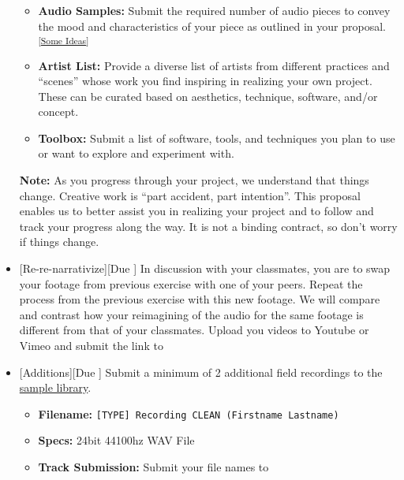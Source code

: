 \begin{itemize}[noitemsep,topsep=0pt,leftmargin=*]
\begin{itemize}
		      \item \textbf{Audio Samples:} Submit the required number of audio pieces to convey the mood and characteristics of your piece as outlined in your proposal. \textsuperscript{[\hyperlink{projideas}{Some Ideas}]}
		      \item \textbf{Artist List:} Provide a diverse list of artists from different practices and ``scenes'' whose work you find inspiring in realizing your own project. These can be curated based on aesthetics, technique, software, and/or concept.
		      \item \textbf{Toolbox:} Submit a list of software, tools, and techniques you plan to use or want to explore and experiment with.
	      \end{itemize}
	      \small{\textbf{Note:} As you progress through your project, we understand that things change. Creative work is ``part accident, part intention''. This proposal enables us to better assist you in realizing your project and to follow and track your progress along the way. It is not a binding contract, so don't worry if things change.}

	\item {}[Re-re-narrativize][Due \dSun] \newline
	      In discussion with your classmates, you are to swap your footage from previous exercise with one of your peers. Repeat the process from the previous exercise with this new footage. We will compare and contrast how your reimagining of the audio for the same footage is different from that of your classmates. Upload you videos to Youtube or Vimeo and submit the link to \discordE

	\item {}[Additions][Due \dSun] \newline
	      Submit a minimum of 2 additional field recordings to the \href{\samplelibPermURL}{sample library}.
	      \begin{itemize}
		      \item \textbf{Filename:} \texttt{[TYPE] Recording CLEAN (Firstname Lastname)}
		      \item \textbf{Specs:} 24bit 44100hz WAV File
		      \item \textbf{Track Submission:} Submit your file names to \discordS
	      \end{itemize}
\end{itemize}
